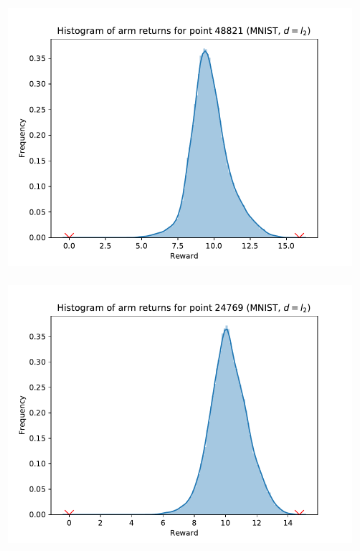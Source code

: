 \begin{figure}[ht]
\begin{subfigure}{.5\textwidth}
  \centering
  \includegraphics[width=\linewidth]{figures/sigma-MNIST-0-L2.pdf}  
\end{subfigure}
\begin{subfigure}{.5\textwidth}
  \centering
  \includegraphics[width=\linewidth]{figures/sigma-MNIST-1-L2.pdf}   
\end{subfigure}
\begin{subfigure}{.5\textwidth}
  \centering

\end{subfigure}
\end{figure}
